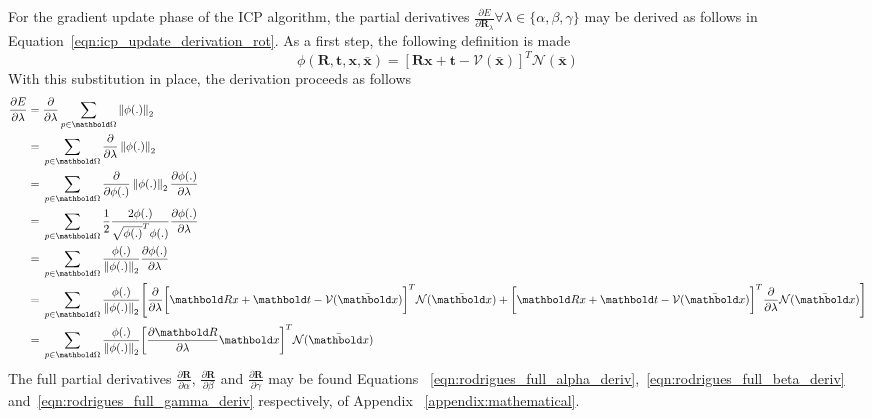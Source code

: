 For the gradient update phase of the ICP algorithm, the partial derivatives
\( \frac{\partial E}{\partial \bm{R}_{\lambda}} \forall \lambda \in \{\alpha, \beta, \gamma \} \) 
may be derived as follows in Equation~\ref{eqn:icp_update_derivation_rot}.
As a first step, the following definition is made
\begin{equation}
  \label{eqn:icp_deriv_sub}
  \phi(\bm{R}, \bm{t}, \bm{x}, \bar{\bm{x}}) =
  {\left[
    \bm{Rx} + \bm{t} - \mathcal{V}(\bar{\bm{x}})
  \right]}^{T}
  \mathcal{N}(\bar{\bm{x}})
\end{equation}
With this substitution in place, the derivation proceeds as follows
\begin{align}
  \label{eqn:icp_update_derivation_rot}
  \frac{\partial E}{\partial \lambda} ={}&
  \frac{\partial}{\partial \lambda}
  \sum_{p \in \bm{\Omega}}
  \norm{\phi(.)}\\
  ={}& \sum_{p \in \bm{\Omega}}
  \frac{\partial}{\partial \lambda}
  \norm{\phi(.)}\\
  ={}& \sum_{p \in \bm{\Omega}}
  \frac{\partial}{\partial \phi(.)} \norm{\phi(.)}
  \frac{\partial \phi(.)}{\partial \lambda}\\
  ={}& \sum_{p \in \bm{\Omega}}
  \frac{1}{2}{\frac{2 \phi(.)}{\sqrt{\phi(.)}^{T}\phi(.)}}
  \frac{\partial \phi(.)}{\partial \lambda}\\
  ={}& \sum_{p \in \bm{\Omega}}
  \frac{\phi(.)}{\norm{\phi(.)}}
  \frac{\partial \phi(.)}{\partial \lambda}\\
  ={}& \sum_{p \in \bm{\Omega}}
  \frac{\phi(.)}{\norm{\phi(.)}}
  \Bigg[ \frac{\partial}{\partial \lambda}
  {\bigg[ \bm{Rx} + \bm{t} - \mathcal{V}(\bar{\bm{x}}) \bigg]}^{T}
  \mathcal{N}(\bar{\bm{x}}) + 
  {\bigg[ \bm{Rx} + \bm{t} - \mathcal{V}(\bar{\bm{x}}) \bigg]}^{T}
  \frac{\partial}{\partial \lambda}
  \mathcal{N}(\bar{\bm{x}})\Bigg]\\
  ={}& \sum_{p \in \bm{\Omega}}
  \frac{\phi(.)}{\norm{\phi(.)}}
  {\bigg[ \frac{\partial \bm{R}}{\partial \lambda}
  \bm{x}\bigg]}^{T}
  \mathcal{N}(\bar{\bm{x}})
\end{align}
The full partial derivatives \(\frac{\partial \bm{R}}{\partial \alpha}\),
\(\frac{\partial \bm{R}}{\partial \beta}\) and
\(\frac{\partial \bm{R}}{\partial \gamma}\) may be found Equations
~\ref{eqn:rodrigues_full_alpha_deriv},~\ref{eqn:rodrigues_full_beta_deriv}
and~\ref{eqn:rodrigues_full_gamma_deriv} respectively, of Appendix 
~\ref{appendix:mathematical}.

